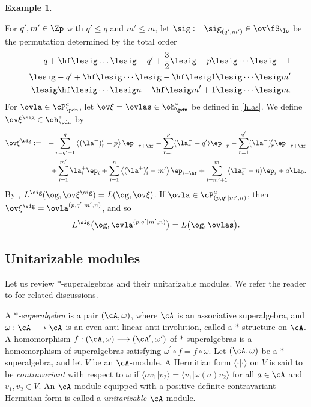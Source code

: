 \documentclass[11pt, reqno]{amsart}
\theoremstyle{definition}
\newtheorem{ex}[thm]{Example}
\theoremstyle{remark}
\numberwithin{equation}{section}
\begin{document}
\begin{ex}\label{ex}

For $q', m' \in \Zp$ with $q' \le q$ and $m'  \le m$, let $\sig:=\sig_{(q',m')} \in \ov\fS_\Is$ be the permutation determined by the total order
\begin{eqnarray}\label{si-order}
&&-q+\hf \lesig \ldots \lesig -q'+\frac{3}{2}  \lesig -p \lesig \cdots \lesig -1   \nonumber\\
&&\lesig -q'+\hf \lesig \cdots \lesig -\hf  \lesig 1 \lesig \cdots \lesig m'   \nonumber \\
&&\lesig \hf \lesig \cdots \lesig n-\hf \lesig m'+1\lesig \cdots \lesig m.
\end{eqnarray}
For $\ovla \in \cP^a_\pdn$, let $\ov\xi=\ovlas  \in \oh_\pdn^*$ be defined in \eqref{hlas}.
We define $\ov\xi^{\sig}\in \oh_\pdn^*$ by
\begin{eqnarray}\label{si-weight}
\ov\xi^{\sig}:=& &- \sum_{r=q'+1}^{q} \left\langle (\la^{-})^\prime_{r} -p \right\rangle \ep_{-r+\hf} -\sum_{r=1}^{p} \langle \la^{-}_{r}-q' \rangle \ep_{-r} - \sum_{r=1}^{q'} (\la^{-})^\prime_{r} \ep_{-r+\hf}   \nonumber\\
& & +\sum_{i=1}^{m'}  \la^+_i  \ep_i+\sum_{i=1}^{n} \left\langle (\la^+)'_i -m' \right\rangle \ep_{i-\hf}+\sum_{i=m'+1}^{m} \langle \la^+_i-n \rangle \ep_i +a \La_0.
\end{eqnarray}
By \cite[Theorem 2.55]{CW}, $L^{\sig}(\og, \ov\xi^{\sig})=L(\og,\ov\xi)$.
If $\ovla\in \cP^a_{(p,q'|m',n)}$, then $\ov\xi^{\sig}=\ovla^{(p,q'|m',n)}$, and so
$$
L^{\sig} \big(\og, \ovla^{(p,q'|m',n)} \big)=L \big(\og, \ovlas \big).
$$
\end{ex}



\subsection{Unitarizable modules} \label{uni-mod}

Let us review $*$-superalgebras and their unitarizable modules. We refer the reader to \cite{CCL, ChL24, CLZ, LZ06} for related discussions.

A \emph{$*$-superalgebra} is a pair $(\cA, \omega)$, where $\cA$ is an associative superalgebra, and $\omega: \cA \longrightarrow \cA$ is an even anti-linear anti-involution, called a $*$-structure on $\cA$.
A homomorphism $f: (\cA,\omega) \longrightarrow (\cA^\prime, \omega^\prime)$ of $*$-superalgebras is a homomorphism of superalgebras satisfying $\omega^\prime \circ f = f \circ \omega$.
%
Let $(\cA,\omega)$ be a $*$-superalgebra, and let $V$ be an $\cA$-module.  A Hermitian form $\langle\cdot|\cdot\rangle$ on $V$ is said to be \emph{contravariant} with respect to $\omega$ if $\langle av_1 | v_2 \rangle=\langle v_1 |\omega(a)v_2 \rangle$ for all $a\in \cA$ and $v_1, v_2 \in V$.
An $\cA$-module equipped with a positive definite contravariant Hermitian form is called a \emph{unitarizable} $\cA$-module.
\end{document}
